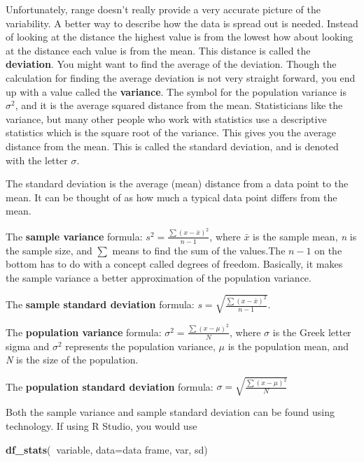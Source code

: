 \documentclass[
]{book}
\newenvironment{Shaded}{\begin{snugshade}}{\end{snugshade}}
\newcommand{\DataTypeTok}[1]{\textcolor[rgb]{0.13,0.29,0.53}{#1}}
\newcommand{\KeywordTok}[1]{\textcolor[rgb]{0.13,0.29,0.53}{\textbf{#1}}}
\newcommand{\NormalTok}[1]{#1}
\newcommand{\OperatorTok}[1]{\textcolor[rgb]{0.81,0.36,0.00}{\textbf{#1}}}
\begin{document}
Unfortunately, range doesn't really provide a very accurate picture of the variability. A better way to describe how the data is spread out is needed. Instead of looking at the distance the highest value is from the lowest how about looking at the distance each value is from the mean. This distance is called the \textbf{deviation}. You might want to find the average of the deviation. Though the calculation for finding the average deviation is not very straight forward, you end up with a value called the \textbf{variance}. The symbol for the population variance is \(\sigma^2\), and it is the average squared distance from the mean. Statisticians like the variance, but many other people who work with statistics use a descriptive statistics which is the square root of the variance. This gives you the average distance from the mean. This is called the standard deviation, and is denoted with the letter \(\sigma\).

The standard deviation is the average (mean) distance from a data point to the mean. It can be thought of as how much a typical data point differs from the mean.

The \textbf{sample variance} formula:
\(s^2=\frac{\sum\left(x-\bar{x}\right)^2}{n-1}\), where \(\bar{x}\) is the sample mean, \emph{n} is the sample size, and \(\sum{}\) means to find the sum of the values.The \(n-1\) on the bottom has to do with a concept called degrees of freedom. Basically, it makes the sample variance a better approximation of the population variance.

The \textbf{sample standard deviation} formula:
\(s=\sqrt{ \frac{\sum\left(x-\bar{x}\right)^2}{n-1}}\).

The \textbf{population variance} formula:
\(\sigma^2 = \frac{\sum\left(x-\mu \right)^2}{N}\), where \(\sigma\) is the Greek letter sigma and \(\sigma^2\) represents the population variance, \(\mu\) is the population mean, and \emph{N} is the size of the population.

The \textbf{population standard deviation} formula:
\(\sigma =\sqrt{ \frac{\sum\left(x-\mu \right)^2}{N}}\)

Both the sample variance and sample standard deviation can be found using technology. If using R Studio, you would use

\begin{Shaded}
\begin{Highlighting}[]
\KeywordTok{df_stats}\NormalTok{(}\OperatorTok{~}\NormalTok{variable, }\DataTypeTok{data=}\NormalTok{data frame, var, sd)}
\end{Highlighting}
\end{Shaded}
\end{document}
